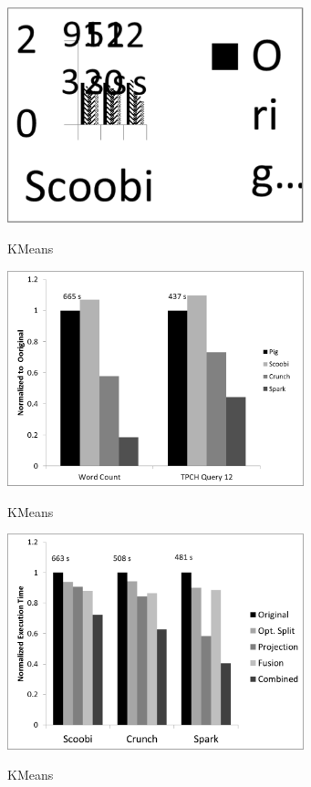 \begin{figure}[!hbt]
    \includegraphics[width=8.6cm]{figures/k-means}
    \label{fig:k-means}\\%
   \caption{KMeans}
\end{figure}

\begin{figure}[!hbt]
    \includegraphics[width=8.6cm]{figures/pig}
    \label{fig:pig}\\%
   \caption{KMeans}
\end{figure}

\begin{figure}[!hbt]
    \includegraphics[width=8.6cm]{figures/tpch}
    \label{fig:tpch}\\%
   \caption{KMeans}
\end{figure}

